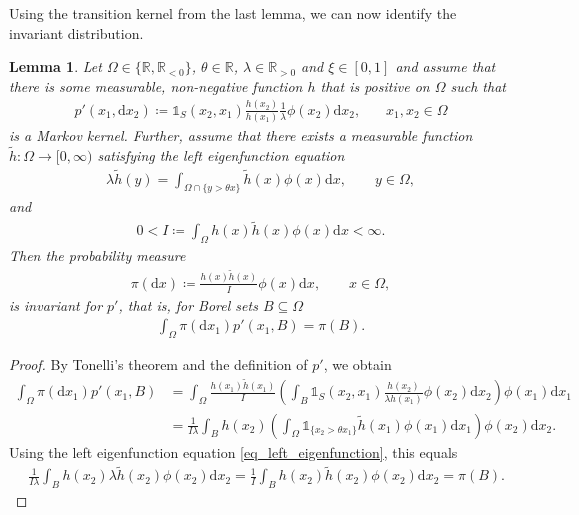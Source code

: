 \documentclass[12pt]{article}
\newcommand{\R}{\mathbb{R}} %
\newcommand{\1}{\mathds{1}}
\renewcommand{\d}{\mathrm{d}}
\theoremstyle{definition}
\theoremstyle{plain}
\newtheorem{Lemma}[definition]{Lemma}
\theoremstyle{remark}
\begin{document}
Using the transition kernel from the last lemma, we can now identify the invariant distribution.
\begin{Lemma}\label{invariant_distribution_limiting_process} 
Let $\Omega\in\{\R,\R_{<0}\}$, $\theta\in\R$, $\lambda\in\R_{>0}$ and $\xi\in[0,1]$ and assume that there is some measurable, non-negative function $h$ that is positive on $\Omega$ such that
\begin{align*}
    p'(x_1,\d x_2)\coloneqq \mathds{1}_S(x_2,x_{1})\frac{h(x_2)}{h(x_1)}\frac{1}{\lambda}\phi(x_2)\d x_2,~~~~~~~~x_1,x_2\in \Omega
\end{align*}
is a Markov kernel. Further, assume that there exists a measurable function $\tilde h:\Omega\to[0,\infty)$ satisfying the left eigenfunction equation \begin{align}\label{eq_left_eigenfunction} 
\lambda \tilde h(y)=\int_{\Omega\cap\{y>\theta x\}}\tilde h(x)\phi(x)\d x,\qquad y\in\Omega,
\end{align} 
and
\begin{align*} 
0< I\coloneqq \int_\Omega h(x)\tilde h(x)\phi(x)\d x <\infty. 
\end{align*} 
Then the probability measure 
\begin{align*} 
\pi(\d x) \coloneqq \frac{h(x)\tilde h(x)}{I} \phi(x)\d x,\qquad x\in\Omega,
\end{align*} 
is invariant for $p'$, that is, for Borel sets $B\subseteq\Omega$
\begin{align*} 
\int_\Omega \pi(\d x_1)p'(x_1,B) = \pi(B). %
\end{align*} 
\end{Lemma} 
\begin{proof} 
By Tonelli's theorem and the definition of $p'$, we obtain 
\begin{align*} 
\int_\Omega \pi(\d x_1)p'(x_1,B) 
&= \int_\Omega \frac{h(x_1)\tilde h(x_1)}{I} \left( \int_B \mathds{1}_S(x_2,x_1) \frac{h(x_2)}{\lambda h(x_1)} \phi(x_2)\d x_2 \right) \phi(x_1)\d x_1 
\\ &= \frac{1}{I\lambda} \int_B h(x_2) \left( \int_\Omega \mathds{1}_{\{x_2>\theta x_1\}} \tilde h(x_1) \phi(x_1)\d x_1 \right) \phi(x_2)\d x_2. 
\end{align*} 
Using the left eigenfunction equation \eqref{eq_left_eigenfunction}, this equals
\begin{align*} 
& \frac{1}{I\lambda} \int_B h(x_2)\lambda\tilde h(x_2) \phi(x_2)\d x_2
= \frac{1}{I} \int_B h(x_2)\tilde h(x_2) \phi(x_2)\d x_2 
= \pi(B). \tag*{\qedhere}
\end{align*} 
\end{proof}
\end{document}
